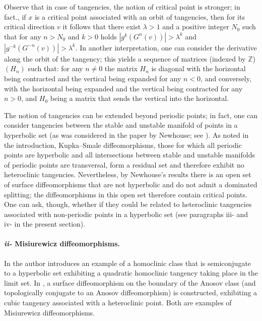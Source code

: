 \documentclass[a4paper,11pt]{article}
\theoremstyle{definition}
\def\ZZ{{\mathbb Z}}
\def\la{\lambda}
\begin{document}
Observe that in case of tangencies, the notion of critical point is stronger; in fact., if $x$ is a critical point associated with an orbit of tangencies, then for its critical direction $v$ it follows that there exist $\la>1$ and a positive integer $N_0$ such that for any  $n>N_0$ and $k>0$ holds $|g^k(G^n(v))|>\la^k$ and $|g^{-k}(G^{-n}(v))|>\la^k.$ In another interpretation, one can consider the derivative along the orbit of the tangency; this yields a sequence of matrices (indexed by $\ZZ$) $(H_n)$ such that: for any $n\neq 0$ the matrix $H_n$ is diagonal with the horizontal being contracted and the vertical being expanded for any $n<0$, and conversely,  with the horizontal being expanded  and the vertical being contracted for any $n>0$, and $H_0$ being a matrix that sends the vertical into the horizontal. 


The notion of tangencies can be extended beyond periodic points; in fact, one can consider tangencies between the stable and unstable manifold of points in a hyperbolic set (as was considered in the paper by Newhouse; see \cite{N}). As noted in the introduction, Kupka–Smale diffeomorphisms, those for which all periodic points are hyperbolic and all intersections between stable and unstable manifolds of periodic points are transversal, form a residual set and therefore exhibit no heteroclinic tangencies. Nevertheless, by Newhouse's results there is an open set of surface diffeomorphisms that are not hyperbolic and do not admit a dominated splitting; the diffeomorphisms in this open set therefore contain critical points. One can ask, though, whether if they could be related to heteroclinic tangencies associated with non-periodic points in a hyperbolic set (see paragraphs iii- and  iv- in the present section).





\paragraph{{\em ii-}  Misiurewicz diffeomorphisms.}  In \cite{R} the author introduces an example of a homoclinic class that is semiconjugate to a hyperbolic set exhibiting a quadratic homoclinic tangency taking place in the limit set.  In \cite{E}, a surface diffeomorphism on the boundary of the Anosov class (and topologically conjugate to an Anosov diffeomorphism) is constructed, exhibiting a cubic tangency associated with a heteroclinic point.
  Both are  examples  of Misiurewicz diffeomorphisms.
\end{document}
